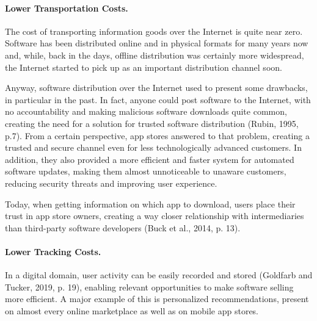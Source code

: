\paragraph{Lower Transportation Costs.}
The cost of transporting information goods over the Internet is quite near zero. Software has been distributed online and in physical formats for many years now and, while, back in the days, offline distribution was certainly more widespread, the Internet started to pick up as an important distribution channel soon.

Anyway, software distribution over the Internet used to present some drawbacks, in particular in the past. In fact, anyone could post software to the Internet, with no accountability and making malicious software downloads quite common, creating the need for a solution for trusted software distribution (Rubin, 1995, p.7). From a certain perspective, app stores answered to that problem, creating a trusted and secure channel even for less technologically advanced customers. In addition, they also provided a more efficient and faster system for automated software updates, making them almost unnoticeable to unaware customers, reducing security threats and improving user experience.

Today, when getting information on which app to download, users place their trust in app store owners, creating a way closer relationship with intermediaries than third-party software developers (Buck et al., 2014, p. 13).


\paragraph{Lower Tracking Costs.}
In a digital domain, user activity can be easily recorded and stored (Goldfarb and Tucker, 2019, p. 19), enabling relevant opportunities to make software selling more efficient. A major example of this is personalized recommendations, present on almost every online marketplace as well as on mobile app stores. 

